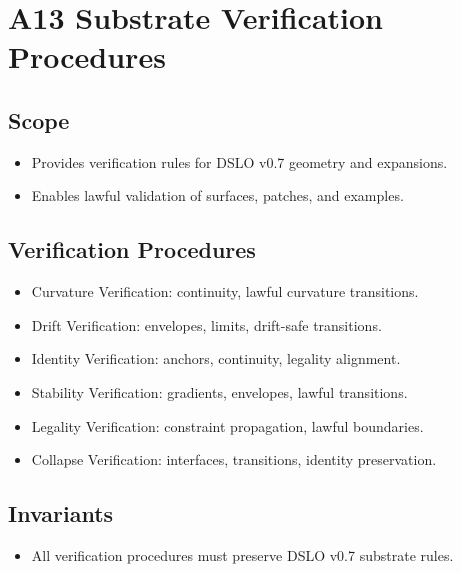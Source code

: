 \section{A13 Substrate Verification Procedures}

\subsection{Scope}
\begin{itemize}
    \item Provides verification rules for DSLO v0.7 geometry and expansions.
    \item Enables lawful validation of surfaces, patches, and examples.
\end{itemize}

\subsection{Verification Procedures}
\begin{itemize}
    \item Curvature Verification: continuity, lawful curvature transitions.
    \item Drift Verification: envelopes, limits, drift-safe transitions.
    \item Identity Verification: anchors, continuity, legality alignment.
    \item Stability Verification: gradients, envelopes, lawful transitions.
    \item Legality Verification: constraint propagation, lawful boundaries.
    \item Collapse Verification: interfaces, transitions, identity preservation.
\end{itemize}

\subsection{Invariants}
\begin{itemize}
    \item All verification procedures must preserve DSLO v0.7 substrate rules.
\end{itemize}
